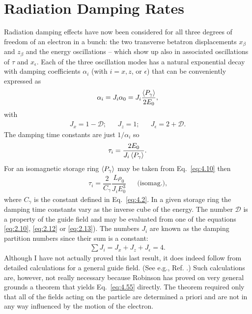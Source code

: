 \section{Radiation Damping Rates}\label{sec:4.4}

Radiation damping effects have now been considered for all three degrees of freedom of an electron in a bunch: the two transverse betatron displacements $x_\beta$ and $z_\beta$ and the energy oscillations -- which show up also in associated oscillations of $\tau$ and $x_\epsilon$. Each of the three oscillation modes has a natural exponential decay with damping coefficients $\alpha_i$ (with $i = x, z$, or $\epsilon$) that can be conveniently expressed as
\begin{align}
	\alpha_i = J_i \alpha_0 = J_i \dfrac{\left< P_\gamma \right>}{2 E_0},
\end{align}
with
\begin{align}
	J_x = 1 - \mathscr{D};&& J_z = 1;&& J_\epsilon = 2 + \mathscr{D}.
\end{align}
The damping time constants are just $1/\alpha_i$ so
\begin{align} \label{eq:4.53}
	\tau_i = \dfrac{2 E_0}{J_i \left< P_\gamma \right>}.
\end{align}
For an isomagnetic storage ring $\left< P_\gamma \right>$ may be taken from Eq.~\eqref{eq:4.10} then
\begin{align} \label{eq:4.54}
	\tau_i = \dfrac{2}{C_\gamma} \dfrac{L \rho_0}{J_i E_0^3} && \text{(isomag.)},
\end{align}
where $C_\gamma$ is the constant defined in Eq.~\ref{eq:4.2}. In a given storage ring the damping
time constants vary as the inverse cube of the energy. The number $\mathscr{D}$ is a property
 of the guide field and may be evaluated from one of the equations \eqref{eq:2.10}, \eqref{eq:2.12}
 or \eqref{eq:2.13}). The numbers $J_i$ are known as the damping partition numbers since their sum is a constant:
\begin{align} \label{eq:4.55}
	\sum J_i = J_x + J_z + J_\epsilon = 4.
\end{align}
Although I have not actually proved this last result, it does indeed follow from detailed calculations for a general guide field. (See e.g., Ref. \cite{5}.) Such calculations are, however, not really necessary because Robinson has proved on very general grounds a theorem that yields Eq.~\eqref{eq:4.55} directly. The theorem required only that all of the fields acting on the particle are determined a priori and are not in any way influenced by the motion of the electron.
